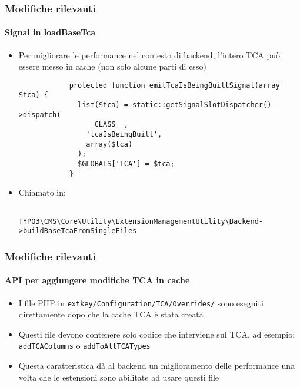 \begin{frame}[fragile]
	\frametitle{Modifiche rilevanti}
	\framesubtitle{Signal in loadBaseTca}

	\lstset{
		basicstyle=\tiny\ttfamily
	}

	\begin{itemize}
		\item Per migliorare le performance nel contesto di backend,
			l'intero TCA può essere messo in cache (non solo alcune parti di esso)

		\begin{lstlisting}
			protected function emitTcaIsBeingBuiltSignal(array $tca) {
			  list($tca) = static::getSignalSlotDispatcher()->dispatch(
			    __CLASS__,
			    'tcaIsBeingBuilt',
			    array($tca)
			  );
			  $GLOBALS['TCA'] = $tca;
			}
		\end{lstlisting}

		\item Chiamato in:

			\begin{lstlisting}
				TYPO3\CMS\Core\Utility\ExtensionManagementUtility\Backend->buildBaseTcaFromSingleFiles
			\end{lstlisting}

	\end{itemize}

\end{frame}  


\begin{frame}[fragile]
	\frametitle{Modifiche rilevanti}
	\framesubtitle{API per aggiungere modifiche TCA in cache}

	\begin{itemize}
		\item I file PHP in \texttt{extkey/Configuration/TCA/Overrides/}
			sono eseguiti direttamente dopo che la cache TCA è stata creata

		\item Questi file devono contenere solo codice che interviene sul TCA,\newline
			ad esempio: \texttt{addTCAColumns} o \texttt{addToAllTCATypes}

		\item Questa caratteristica dà al backend un miglioramento delle performance una volta che le estensioni sono abilitate ad usare questi file

	\end{itemize}

\end{frame} 

